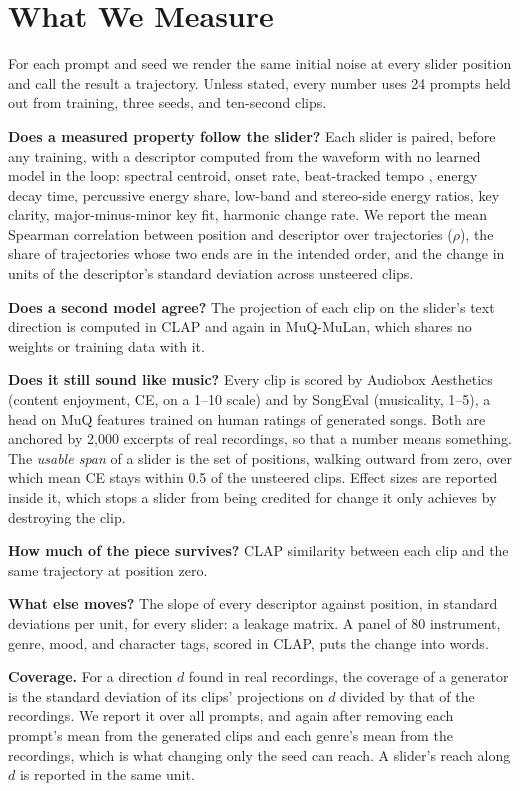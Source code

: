 \section{What We Measure}

For each prompt and seed we render the same initial noise at every slider position and call the result a trajectory. Unless stated, every number uses 24 prompts held out from training, three seeds, and ten-second clips.

\textbf{Does a measured property follow the slider?} Each slider is paired, before any training, with a descriptor computed from the waveform with no learned model in the loop: spectral centroid, onset rate, beat-tracked tempo \citep{foscarin2024beatthis}, energy decay time, percussive energy share, low-band and stereo-side energy ratios, key clarity, major-minus-minor key fit, harmonic change rate. We report the mean Spearman correlation between position and descriptor over trajectories ($\rho$), the share of trajectories whose two ends are in the intended order, and the change in units of the descriptor's standard deviation across unsteered clips.

\textbf{Does a second model agree?} The projection of each clip on the slider's text direction is computed in CLAP and again in MuQ-MuLan, which shares no weights or training data with it.

\textbf{Does it still sound like music?} Every clip is scored by Audiobox Aesthetics \citep{tjandra2025aesthetics} (content enjoyment, CE, on a 1--10 scale) and by SongEval \citep{yao2025songeval} (musicality, 1--5), a head on MuQ features trained on human ratings of generated songs. Both are anchored by 2{,}000 excerpts of real recordings, so that a number means something. The \emph{usable span} of a slider is the set of positions, walking outward from zero, over which mean CE stays within 0.5 of the unsteered clips. Effect sizes are reported inside it, which stops a slider from being credited for change it only achieves by destroying the clip.

\textbf{How much of the piece survives?} CLAP similarity between each clip and the same trajectory at position zero.

\textbf{What else moves?} The slope of every descriptor against position, in standard deviations per unit, for every slider: a leakage matrix. A panel of 80 instrument, genre, mood, and character tags, scored in CLAP, puts the change into words.

\textbf{Coverage.} For a direction $d$ found in real recordings, the coverage of a generator is the standard deviation of its clips' projections on $d$ divided by that of the recordings. We report it over all prompts, and again after removing each prompt's mean from the generated clips and each genre's mean from the recordings, which is what changing only the seed can reach. A slider's reach along $d$ is reported in the same unit.
